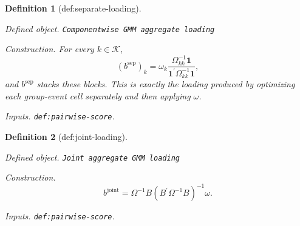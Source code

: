 \documentclass{article}
\newtheorem{definition}{Definition}
\begin{document}
\begin{definition}[def:separate-loading]\label{def:separate-loading}
\par\smallskip\noindent\emph{Defined object.} \texttt{Componentwise GMM aggregate loading}
\par\smallskip\noindent\emph{Construction.} For every \(k\in\mathcal K\), \[(b^{\mathrm{sep}})_k=\omega_k\frac{\Omega_{kk}^{-1}\mathbf 1}{\mathbf 1^{\prime}\Omega_{kk}^{-1}\mathbf 1},\] and \(b^{\mathrm{sep}}\) stacks these blocks. This is exactly the loading produced by optimizing each group-event cell separately and then applying \(\omega\).
\par\smallskip\noindent\emph{Inputs.} \texttt{def:\allowbreak{}pairwise-\allowbreak{}score}.
\end{definition}

\begin{definition}[def:joint-loading]\label{def:joint-loading}
\par\smallskip\noindent\emph{Defined object.} \texttt{Joint aggregate GMM loading}
\par\smallskip\noindent\emph{Construction.} \[b^{\mathrm{joint}}=\Omega^{-1}B(B^{\prime}\Omega^{-1}B)^{-1}\omega.\]
\par\smallskip\noindent\emph{Inputs.} \texttt{def:\allowbreak{}pairwise-\allowbreak{}score}.
\end{definition}
\end{document}
